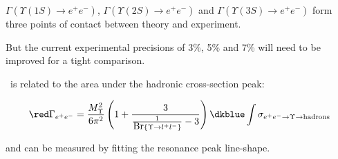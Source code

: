 
\begin{slide*}

\slideframe{}
\huge
{}

\begin{minipage}[t]{\linewidth}
\Large

$\Gamma(\Upsilon(1S) \to e^+e^-)$, $\Gamma(\Upsilon(2S) \to e^+e^-)$
	and $\Gamma(\Upsilon(3S) \to e^+e^-)$ form three points of
	contact between theory and experiment.

\vspace{0.5 cm}

But the current experimental precisions of 3\%, 5\% and 7\%
	will need to be improved for a tight comparison.

\vspace{1 cm}

{\red \gamee}\  is related to the {\dkblue area under the hadronic cross-section peak}:

\[ {\red \Gamma_{e^+e^-}} = \frac{M_\Upsilon^2}{6 \pi^2}
	\left( 1 + \frac{3}{\frac{1}{\mbox{Br}\{\Upsilon \to l^+l^-\}} - 3} \right)
	{\dkblue \int \sigma_{e^+e^- \to \Upsilon \to {\rm hadrons}} } \]

and can be measured by fitting the resonance peak line-shape.

\vspace{0.5 cm}

\begin{center}
\end{center}

\vspace{0.5 cm}

{ \dkgreen {} }

\end{minipage}

\end{slide*}


